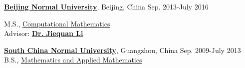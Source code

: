 \documentclass[12pt]{article}
\newenvironment{outerlist}[1][\enskip\textbullet]%
        {\begin{itemize}[#1,leftmargin=*]}{\end{itemize}%
         \vspace{-.6\baselineskip}}
\newenvironment{innerlist}[1][\enskip\textbullet]%
        {\begin{itemize}[#1,leftmargin=*,parsep=0pt,itemsep=0pt,topsep=0pt,partopsep=0pt]}
        {\end{itemize}}
\begin{document}
\vspace{.1in}
\href{https://english.bnu.edu.cn/}{\textbf{Beijing Normal University}},
Beijing, China     \hfill   Sep. 2013-July 2016

M.S.,
        \href{http://math.english.bnu.edu.cn/}
           {Computational Mathematics}
       \\
Advisor:
             \href{http://math0.bnu.edu.cn/~lijiequan/}
                  {\textbf{Dr. Jiequan Li}} 
                
\vspace{.1in}
\href{http://english.scnu.edu.cn/}{\textbf{South China Normal University}},
Guangzhou, China \hfill Sep. 2009-July 2013\\
B.S.,
        \href{http://maths.scnu.edu.cn/}
             {Mathematics and Applied Mathematics} \\
\end{document}
